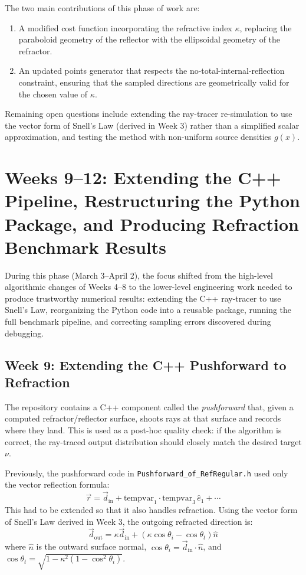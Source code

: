 \documentclass{article}
\begin{document}
The two main contributions of this phase of work are:
\begin{enumerate}
    \item A modified cost function incorporating the refractive index $\kappa$, replacing
    the paraboloid geometry of the reflector with the ellipsoidal geometry of the
    refractor.
    \item An updated points generator that respects the no-total-internal-reflection
    constraint, ensuring that the sampled directions are geometrically valid for the
    chosen value of $\kappa$.
\end{enumerate}

Remaining open questions include extending the ray-tracer re-simulation to use the vector
form of Snell's Law (derived in Week 3) rather than a simplified scalar approximation,
and testing the method with non-uniform source densities $g(x)$.

\section{Weeks 9--12: Extending the C++ Pipeline, Restructuring the Python Package, and Producing Refraction Benchmark Results}

During this phase (March 3--April 2), the focus shifted from the high-level algorithmic changes of Weeks 4--8 to the lower-level engineering work needed to produce trustworthy numerical results: extending the C++ ray-tracer to use Snell's Law, reorganizing the Python code into a reusable package, running the full benchmark pipeline, and correcting sampling errors discovered during debugging.

\subsection{Week 9: Extending the C++ Pushforward to Refraction}

The repository contains a C++ component called the \emph{pushforward} that, given a computed refractor/reflector surface, shoots rays at that surface and records where they land. This is used as a post-hoc quality check: if the algorithm is correct, the ray-traced output distribution should closely match the desired target $\nu$.

Previously, the pushforward code in \texttt{Pushforward\_of\_RefRegular.h} used only the vector reflection formula:
\begin{equation}
    \vec{r} = \vec{d}_{\text{in}} + \text{tempvar}_1 \cdot \text{tempvar}_3 \,\hat{e}_1 + \cdots
\end{equation}
This had to be extended so that it also handles refraction. Using the vector form of Snell's Law derived in Week 3, the outgoing refracted direction is:
\begin{equation}
    \vec{d}_{\text{out}} = \kappa \vec{d}_{\text{in}} + (\kappa \cos\theta_i - \cos\theta_t)\hat{n}
\end{equation}
where $\hat{n}$ is the outward surface normal, $\cos\theta_i = \vec{d}_{\text{in}} \cdot \hat{n}$, and $\cos\theta_t = \sqrt{1 - \kappa^2(1 - \cos^2\theta_i)}$.
\end{document}
